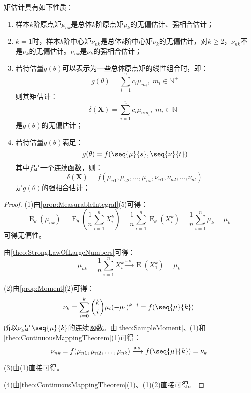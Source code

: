 \begin{property}\label{prop:MomentEstimation}
	矩估计具有如下性质：
	\begin{enumerate}
		\item 样本$k$阶原点矩$\mu_{nk}$是总体$k$阶原点矩$\mu_k$的无偏估计、强相合估计；
		\item $k=1$时，样本$k$阶中心矩$\nu_{nk}$是总体$k$阶中心矩$\nu_k$的无偏估计，对$k\geqslant2$，$\nu_{nk}$不是$\nu_k$的无偏估计。$\nu_{nk}$是$\nu_k$的强相合估计；
		\item 若待估量$g(\theta)$可以表示为一些总体原点矩的线性组合时，即：
		\begin{equation*}
			g(\theta)=\sum_{i=1}^{n}c_i\mu_{m_i},\;m_i\in\mathbb{N}^+
		\end{equation*}
		则其矩估计：
		\begin{equation*}
			\delta(\mathbf{X})=\sum_{i=1}^{n}c_i\mu_{nm_i},\;m_i\in\mathbb{N}^+
		\end{equation*}
		是$g(\theta)$的无偏估计；
		\item 若待估量$g(\theta)$满足：
		\begin{equation*}
			g(\theta)=f(\seq{\mu}{s},\seq{\nu}{t})
		\end{equation*}
		其中$f$是一个连续函数，则：
		\begin{equation*}
			\delta(\mathbf{X})=f(\mu_{n1},\mu_{n2},\dots,\mu_{ns},\nu_{n1},\nu_{n2},\dots,\nu_{nt})
		\end{equation*}
		是$g(\theta)$的强相合估计；
	\end{enumerate}
\end{property}
\begin{proof}
	(1)由\cref{prop:MeasurableIntegral}(5)可得：
	\begin{equation*}
		\operatorname{E}_{\theta}(\mu_{nk})=\operatorname{E}_{\theta}\left(\frac{1}{n}\sum_{i=1}^{n}X_i^k\right)=\frac{1}{n}\sum_{i=1}^{n}\operatorname{E}_{\theta}(X_i^k)=\frac{1}{n}\sum_{i=1}^{n}\mu_k=\mu_k
	\end{equation*}
	可得无偏性。\par
	由\cref{theo:StrongLawOfLargeNumbers}可得：
	\begin{equation*}
		\mu_{nk}=\frac{1}{n}\sum_{i=1}^{n}X_i^k\overset{\text{a.s.}}{\longrightarrow}\operatorname{E}(X_1^k)=\mu_k
	\end{equation*}\par
	(2)由\cref{prop:Moment}(2)可得：
	\begin{equation*}
		\nu_k=\sum_{i=0}^{k}\binom{k}{i}\mu_i(-\mu_1)^{k-i}=f(\seq{\mu}{k})
	\end{equation*}
	所以$\nu_k$是$\seq{\mu}{k}$的连续函数。由\cref{theo:SampleMoment}、(1)和\cref{theo:ContinuousMappingTheorem}(1)可得：
	\begin{equation*}
		\nu_{nk}=f(\mu_{n1},\mu_{n2},\dots,\mu_{nk})\overset{\text{a.s.}}{\longrightarrow}f(\seq{\mu}{k})=\nu_{k}
	\end{equation*}\par
	(3)由(1)直接可得。\par
	(4)由\cref{theo:ContinuousMappingTheorem}(1)、(1)(2)直接可得。
\end{proof}